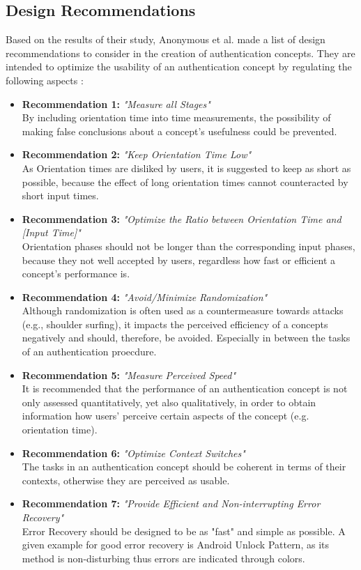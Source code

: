 \subsection{Design Recommendations}

Based on the results of their study, Anonymous et al. \cite{anonymous} made a list of design recommendations to consider in the creation of authentication concepts. They are intended to optimize the usability of an authentication concept by regulating the following aspects \cite{anonymous}:

\begin{itemize}
    \item \textbf{Recommendation 1:} \textit{"Measure all Stages"}\\
    By including orientation time into time measurements, the possibility of making false conclusions about a concept's usefulness could be prevented.
    \item \textbf{Recommendation 2:} \textit{"Keep Orientation Time Low"}\\
    As Orientation times are disliked by users, it is suggested to keep as short as possible, because the effect of long orientation times cannot counteracted by short input times.
    \item \textbf{Recommendation 3:} \textit{"Optimize the Ratio between Orientation Time and [Input Time]"} \\
    Orientation phases should not be longer than the corresponding input phases, because they not well accepted by users, regardless how fast or efficient a concept's performance is.
    \item \textbf{Recommendation 4:} \textit{"Avoid/Minimize Randomization"}\\ 
    Although randomization is often used as a countermeasure towards attacks (e.g., shoulder surfing), it impacts the perceived efficiency of a concepts negatively and should, therefore, be avoided. Especially in between the tasks of an authentication proecdure.
    \item \textbf{Recommendation 5:} \textit{"Measure Perceived Speed"}\\
    It is recommended that the performance of an authentication concept is not only assessed quantitatively, yet also qualitatively, in order to obtain information how users' perceive certain aspects of the concept (e.g. orientation time).  
    \item \textbf{Recommendation 6:} \textit{"Optimize Context Switches"}\\
    The tasks in an authentication concept should be coherent in terms of their contexts, otherwise they are perceived as usable. 
    \item \textbf{Recommendation 7:} \textit{"Provide Efficient and Non-interrupting Error Recovery"}\\
    Error Recovery should be designed to be as "fast" and simple as possible. A given example for good error recovery is Android Unlock Pattern, as its method is non-disturbing thus errors are indicated through colors.  
    
    
\end{itemize}


